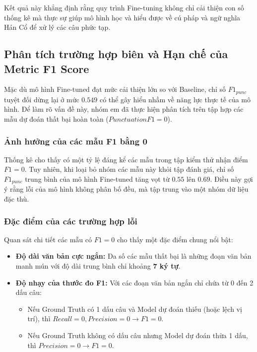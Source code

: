 Kết quả này khẳng định rằng quy trình Fine-tuning không chỉ cải thiện con số thống kê mà thực sự giúp mô hình học và hiểu được về cú pháp và ngữ nghĩa Hán Cổ để xử lý các câu phức tạp.

\subsection{Phân tích trường hợp biên và Hạn chế của Metric F1 Score}

Mặc dù mô hình Fine-tuned đạt mức cải thiện lớn so với Baseline, chỉ số $F1_{punc}$ tuyệt đối dừng lại ở mức $0.549$ có thể gây hiểu nhầm về năng lực thực tế của mô hình. Để làm rõ vấn đề này, nhóm em đã thực hiện phân tích trên tập hợp các mẫu dự đoán thất bại hoàn toàn ($Punctuation F1 = 0$).

\subsubsection{Ảnh hưởng của các mẫu F1 bằng 0}
Thống kê cho thấy có một tỷ lệ đáng kể các mẫu trong tập kiểm thử nhận điểm $F1=0$. Tuy nhiên, khi loại bỏ nhóm các mẫu này khỏi tập đánh giá, chỉ số $F1_{punc}$ trung bình của mô hình Fine-tuned tăng vọt từ $0.55$ lên \textbf{$0.69$}. Điều này gợi ý rằng lỗi của mô hình không phân bố đều, mà tập trung vào một nhóm dữ liệu đặc thù.

\subsubsection{Đặc điểm của các trường hợp lỗi}
Quan sát chi tiết các mẫu có $F1=0$ cho thấy một đặc điểm chung nổi bật:
\begin{itemize}
    \item \textbf{Độ dài văn bản cực ngắn:} Đa số các mẫu thất bại là những đoạn văn bản manh mún với độ dài trung bình chỉ khoảng \textbf{7 ký tự}.
    \item \textbf{Độ nhạy của thước đo F1:} Với các đoạn văn bản ngắn chỉ chứa từ 0 đến 2 dấu câu:
    \begin{itemize}
        \item Nếu Ground Truth có 1 dấu câu và Model dự đoán thiếu (hoặc lệch vị trí), thì $Recall=0, Precision=0 \to F1=0$.
        \item Nếu Ground Truth không có dấu câu nhưng Model dự đoán thừa 1 dấu, thì $Precision=0 \to F1=0$.
    \end{itemize}
\end{itemize}

